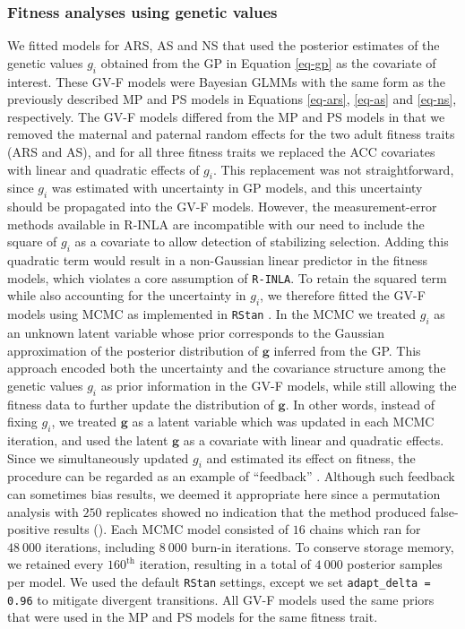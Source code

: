 \documentclass[dvipsnames]{article}
\begin{document}
\subsubsection*{Fitness analyses using genetic values}

We fitted models for ARS, AS and NS that used the posterior estimates of the genetic values $g_i$ obtained from the GP in Equation \eqref{eq-gp} as the covariate of interest.
These GV-F models were Bayesian GLMMs with the same form as the previously described MP and PS models in Equations \eqref{eq-ars}, \eqref{eq-as} and \eqref{eq-ns}, respectively.
The GV-F models differed from the MP and PS models in that we removed the maternal and paternal random effects for the two adult fitness traits (ARS and AS), and for all three fitness traits we replaced the ACC covariates with linear and quadratic effects of $g_i$.
This replacement was not straightforward, since $g_i$ was estimated with uncertainty in GP models, and this uncertainty should be propagated into the GV-F models.
However, the measurement-error methods available in R-INLA are incompatible with our need to include the square of $g_i$ as a covariate to allow detection of stabilizing selection.
Adding this quadratic term would result in a non-Gaussian linear predictor in the fitness models, which violates a core assumption of \texttt{R-INLA}.
To retain the squared term while also accounting for the uncertainty in $g_i$, we therefore fitted the GV-F models using MCMC as implemented in \texttt{RStan} \citep{rstan}.
In the MCMC we treated $g_i$ as an unknown latent variable whose prior corresponds to the Gaussian approximation of the posterior distribution of $\bm g$ inferred from the GP.
This approach encoded both the uncertainty and the covariance structure among the genetic values $g_i$ as prior information in the GV-F models, while still allowing the fitness data to further update the distribution of $\bm g$.
In other words, instead of fixing $g_i$, we treated $\bm g$ as a latent variable which was updated in each MCMC iteration, and used the latent $\bm g$ as a covariate with linear and quadratic effects.
Since we simultaneously updated $g_i$ and estimated its effect on fitness, the procedure can be regarded as an example of ``feedback'' \citep{plummer2015cuts}.
Although such feedback can sometimes bias results, we deemed it appropriate here since a permutation analysis with $250$ replicates showed no indication that the method produced false-positive results ().
Each MCMC model consisted of $16$ chains which ran for $48\ 000$ iterations, including $8\ 000$ burn-in iterations.
To conserve storage memory, we retained every $160^\text{th}$ iteration, resulting in a total of $4\ 000$ posterior samples per model.
We used the default \texttt{RStan} settings, except we set \texttt{adapt\_delta = 0.96} to mitigate divergent transitions.
All GV-F models used the same priors that were used in the MP and PS models for the same fitness trait.
\end{document}
